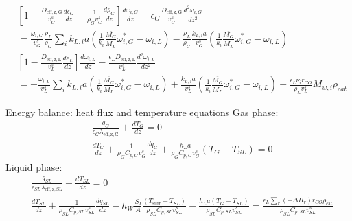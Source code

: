 \documentclass{article}
\begin{document}
\begin{equation}
	\begin{split}
	&\left[1 - \frac{D_{\mathrm{eff,z,G}}}{v_G^s}\frac{d \epsilon_G}{dz} -\frac{1}{\rho_Gv_G^s}\frac{d\rho_G}{dz}\right]\frac{d\omega_{i,G}}{dz} - \epsilon_G \frac{D_{\mathrm{eff,z,G}}}{v_G^s}\frac{d^2\omega_{i,G}}{dz^2} \\
	&=\frac{\omega_{i,G}}{v_G^s}\frac{\rho_L}{\rho_G}\sum_ik_{L,i}a(\frac{1}{k_i}\frac{\overline{M_G}}{\overline{M_L}}\omega_{i,G}^*-\omega_{i,L})  - \frac{\rho_L}{\rho_G}\frac{k_{L,i}a}{v_G^s}(\frac{1}{k_i}\frac{\overline{M_G}}{\overline{M_L}}\omega_{i,G}^*-\omega_{i,L})\\
	&\left[1 -  \frac{D_{\mathrm{eff,z,L}}}{v_L^s}\frac{d\epsilon_L}{dz} \right]\frac{d\omega_{i,L}}{dz} - \frac{\epsilon_L D_{\mathrm{eff,z,L}}}{v_L^s}\frac{d^2\omega_{i,L}}{dz^2} \\
	&= - \frac{\omega_{i,L}}{v_L^s}\sum_ik_{L,i}a(\frac{1}{k_i}\frac{\overline{M_G}}{\overline{M_L}}\omega_{i,G}^*-\omega_{i,L}) + \frac{k_{L,i}a}{v_L^s}(\frac{1}{k_i}\frac{\overline{M_G}}{\overline{M_L}}\omega_{i,G}^*-\omega_{i,L}) + \frac{\epsilon_L \nu_i r_{CO}}{\rho_L v_L^s}M_{w,i}\rho_{cat}
	\end{split}
\end{equation}

Energy balance: heat flux and temperature equations
Gas phase:
\begin{equation}
\begin{split}
& \frac{q_G}{\epsilon_G\lambda_{\mathrm{eff,z,G}}} + \frac{dT_G}{dz} = 0\\
& \frac{dT_G}{dz} + \frac{1}{\rho_G C_{p,G} v_G^s}\frac{dq_G}{dz} + \frac{h_L a}{\rho_G C_{p,G} v_G^s}(T_G - T_{SL}) = 0
\end{split}
\end{equation}
Liquid phase:
\begin{equation}
\begin{split}
& \frac{q_{SL}}{\epsilon_{SL}\lambda_{\mathrm{eff,z,SL}}} + \frac{dT_{SL}}{dz} = 0 \\
& \frac{d T_{SL}}{dz} + \frac{1}{\rho_{SL}C_{p,SL}v_{SL}^s}\frac{dq_{SL}}{dz} - h_W\frac{S_I}{A}\frac{(T_{\mathrm{surr}}-T_{SL})}{\rho_{SL}C_{p,SL}v_{SL}^s} - \frac{h_L a(T_G - T_{SL})}{\rho_{SL}C_{p,SL}v_{SL}^s} = \frac{\epsilon_{L}\sum_r (-\Delta H_r)r_{CO}\rho_{\mathrm{cat}}}{\rho_{SL}C_{p,SL}v_{SL}^s}
\end{split}
\end{equation}


 
\end{document}
